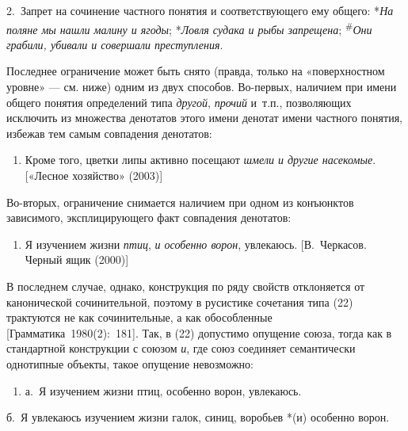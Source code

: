 2.~Запрет на сочинение частного понятия и соответствующего ему общего:
*\textit{На поляне мы нашли малину и ягоды}; *\textit{Ловля судака и рыбы
запрещена}; \textsuperscript{\#}\textit{Они грабили, убивали и совершали
преступления}.

Последнее ограничение может быть снято (правда, только на «поверхностном
уровне» --- см. ниже) одним из двух способов. Во-первых, наличием при
имени общего понятия определений типа \textit{другой}, \textit{прочий}
и~т.п., позволяющих исключить из множества денотатов этого имени денотат
имени частного понятия, избежав тем самым совпадения денотатов:

\begin{enumerate}
\def\labelenumi{(\arabic{enumi})}
\setcounter{enumi}{20}
\item
  Кроме того, цветки липы активно посещают \textit{шмели и другие
  насекомые}. {[}«Лесное хозяйство» (2003){]}
\end{enumerate}

Во-вторых, ограничение снимается наличием при одном из конъюнктов
зависимого, эксплицирующего факт совпадения денотатов:

\begin{enumerate}
\def\labelenumi{(\arabic{enumi})}
\setcounter{enumi}{21}
\item
  Я изучением жизни \textit{птиц}, \textit{и особенно ворон}, увлекаюсь.
  {[}В.~Черкасов. Черный ящик (2000){]}
\end{enumerate}

В последнем случае, однако, конструкция по ряду свойств отклоняется от
канонической сочинительной, поэтому в русистике сочетания типа (22)
трактуются не как сочинительные, а как обособленные
{[}Грамматика~1980(2):~181{]}. Так, в (22) допустимо опущение союза,
тогда как в стандартной конструкции с союзом \textit{и}, где союз
соединяет семантически однотипные объекты, такое опущение невозможно:

\begin{enumerate}
\def\labelenumi{(\arabic{enumi})}
\setcounter{enumi}{22}
\item
  а.~Я изучением жизни птиц, особенно ворон, увлекаюсь.
\end{enumerate}

б.~Я увлекаюсь изучением жизни галок, синиц, воробьев *(и) особенно
ворон.

